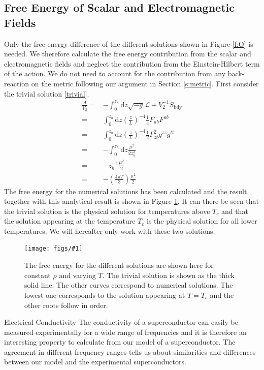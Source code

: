 \documentclass[12pt]{report}
\renewcommand{\d}{\ensuremath{\mathrm{d}}}
\renewcommand{\L}{\ensuremath{\mathcal{L}}}
\newcommand{\fig}[3]{
\begin{figure}
\centering
\texttt{[image: figs/\#1]}
\caption{#2}
\end{figure}
}
\begin{document}
\subsection{Free Energy of Scalar and Electromagnetic Fields}
Only the free energy difference of the different solutions shown in Figure \ref{f:O} is needed. We therefore calculate the free energy contribution from the scalar and electromagnetic fields and neglect the contribution from the Einstein-Hilbert term of the action. We do not need to account for the contribution from any back-reaction on the metric following our argument in Section \ref{s:metric}. First consider the trivial solution \eqref{trivial}.
\begin{equation}
\begin{split}
 \frac{A}{V_\mathrm{2}}=&-\int_0^{z_h}\d z \sqrt{-g}\L+V_\mathrm{2}^{-1}S_{\mathrm{bdy}}\\
=&\int_0^{z_h}\d z \left(\frac{z}{L}\right)^{-4}\frac{1}{4}F_{ab}F^{ab}\\
=&\int_0^{z_h}\d z \left(\frac{z}{L}\right)^{-4}\frac{1}{2}F_{zt}^2g^{zz}g^{tt}\\
=&-\int_0^{z_h}\d z \frac{\mu^2}{2z_h^2}\\
=&-z_h^{-1}\frac{\mu^2}{2}\\
=&-\left(\frac{4\pi T}{3}\right)\frac{\mu^2}{2}
\end{split}
\end{equation}
The free energy for the numerical solutions has been calculated and the result together with this analytical result is shown in Figure \ref{f:A}. It can there be seen that the trivial solution is the physical solution for temperatures above $T_c$ and that the solution appearing at the temperature $T_c$ is the physical solution for all lower temperatures. We will hereafter only work with these two solutions.

\fig{A}{The free energy for the different solutions are shown here for constant $\rho$ and varying $T$. The trivial solution is shown as the thick solid line. The other curves correspond to numerical solutions. The lowest one corresponds to the solution appearing at $T=T_c$ and the other roots follow in order.\label{f:A}}

\section{Electrical Conductivity}
The conductivity of a superconductor can easily be measured experimentally for a wide range of frequencies and it is therefore an interesting property to calculate from our model of a superconductor. The agreement in different frequency ranges tells us about similarities and differences between our model and the experimental superconductors.\\
\end{document}
